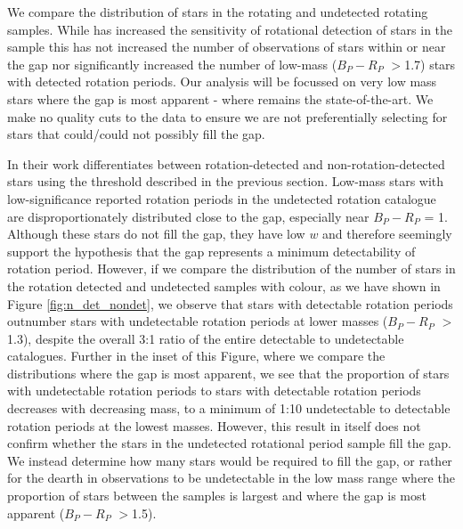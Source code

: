 We compare the distribution of stars in the \citet{mcquillan_rotational_2014} \kepler{} rotating and undetected rotating samples.
While \citet{santos_surface_2019} has increased the sensitivity of rotational detection of stars in the \kepler{} sample this has not increased the number of observations of stars within or near the gap nor significantly increased the number of low-mass ($B_P-R_P$ $>$1.7) stars with detected rotation periods.
Our analysis will be focussed on very low mass stars where the gap is most apparent - where \citet{mcquillan_rotational_2014} remains the state-of-the-art.
We make no quality cuts to the data to ensure we are not preferentially selecting for stars that could/could not possibly fill the gap.

In their work \citet{mcquillan_rotational_2014} differentiates between rotation-detected and non-rotation-detected stars using the threshold described in the previous section. 
Low-mass stars with low-significance reported rotation periods in the undetected rotation catalogue are disproportionately distributed close to the gap, especially near $B_P-R_P$ = 1. 
Although these stars do not fill the gap, they have low $w$ and therefore seemingly support the hypothesis that the gap represents a minimum detectability of rotation period.
However, if we compare the distribution of the number of stars in the rotation detected and undetected samples with colour, as we have shown in Figure \ref{fig:n_det_nondet}, we observe that stars with detectable rotation periods outnumber stars with undetectable rotation periods at lower masses ($B_P-R_P$ $>$1.3), despite the overall 3:1 ratio of the entire detectable to undetectable catalogues.
Further in the inset of this Figure, where we compare the distributions where the gap is most apparent, we see that the proportion of stars with undetectable rotation periods to stars with detectable rotation periods decreases with decreasing mass, to a minimum of 1:10 undetectable to detectable rotation periods at the lowest masses.
However, this result in itself does not confirm whether the stars in the undetected rotational period sample fill the gap.
We instead determine how many stars would be required to fill the gap, or rather for the dearth in observations to be undetectable in the low mass range where the proportion of stars between the samples is largest and where the gap is most apparent ($B_P-R_P$ $>$1.5).


